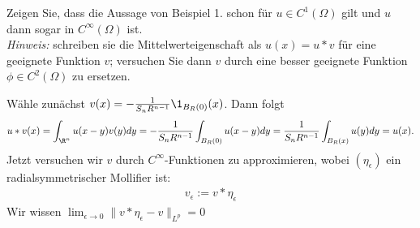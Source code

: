 
\begin{exercise}

Zeigen Sie, dass die Aussage von Beispiel 1. schon für $u \in C^1(\Omega)$ gilt und $u$ dann sogar in $C^\infty(\Omega)$ ist. \\
\textit{Hinweis:}
schreiben sie die Mittelwerteigenschaft als $u(x) = u \ast v$ für eine geeignete Funktion $v$;
versuchen Sie dann $v$ durch eine besser geeignete Funktion $\phi \in C^2(\Omega)$ zu ersetzen.

\end{exercise}


\begin{solution}

Wähle zunächst $v(x) = -\frac{1}{S_nR^{n-1}}\1_{B_R(0)}(x)$. Dann folgt
\begin{align*}
  u*v(x) = \int_{\R^n}u(x-y)v(y) dy = -\frac{1}{S_nR^{n-1}}\int_{B_R(0)}u(x-y) dy = \frac{1}{S_nR^{n-1}}\int_{B_R(x)}u(y) dy = u(x).
\end{align*}
Jetzt versuchen wir $v$ durch $C^{\infty}$-Funktionen zu approximieren,
wobei $(\eta_{\epsilon})$ ein radialsymmetrischer Mollifier ist:
\begin{align*}
  v_{\epsilon} := v*\eta_{\epsilon}
\end{align*}
Wir wissen $\lim_{\epsilon  \to 0}\|v*\eta_{\epsilon} - v\|_{L^p} = 0$
\end{solution}

